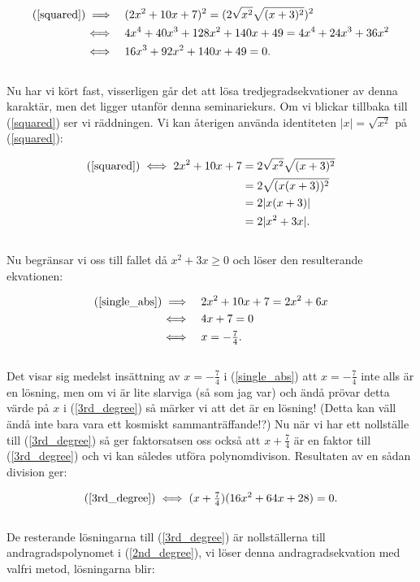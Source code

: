 \documentclass{article}
\begin{document}
\begin{align}
  \text{(\ref{squared})} \implies \quad & (2x^{2} + 10x + 7)^{2} = (2\sqrt{x^{2}}\sqrt{(x+3)^{2}})^{2} \nonumber\\
  \iff \quad & 4x^{4} + 40x^{3} + 128x^{2} + 140x + 49 = 4x^{4} + 24x^{3} + 36x^{2} \nonumber\\
  \iff \quad & 16x^{3} + 92x^{2} + 140x + 49 = 0\text{.} \label{3rd_degree}
\end{align}
\\
Nu har vi kört fast, visserligen går det att lösa tredjegradsekvationer av denna karaktär, men det ligger utanför denna seminariekurs. Om vi blickar tillbaka till (\ref{squared}) ser vi räddningen. Vi kan återigen använda identiteten $|x| = \sqrt{x^{2}}$ på (\ref{squared}):

\begin{align}
  \text(\ref{squared}) \iff 2x^{2} + 10x + 7 &= 2\sqrt{x^{2}}\sqrt{(x+3)^{2}}\nonumber\\
                        &= 2\sqrt{(x(x+3))^{2}}\nonumber\\
                        &= 2|x(x+3)|\nonumber\\
                        &= 2|x^{2} + 3x|\text{.} \label{single_abs}
\end{align}
\\
Nu begränsar vi oss till fallet då $x^{2} + 3x \geq 0$ och löser den resulterande ekvationen:

\begin{align*}
  \text{(\ref{single_abs})} \implies \quad & 2x^{2} + 10x + 7 = 2x^{2} + 6x\\
  \iff \quad & 4x + 7 = 0 \\
  \iff \quad & x = -\tfrac{7}{4}\text{.}
\end{align*}
\\
Det visar sig medelst insättning av $x=-\tfrac{7}{4}$ i (\ref{single_abs}) att $x = -\tfrac{7}{4}$ inte alls är en lösning, men om vi är lite slarviga (så som jag var) och ändå prövar detta värde på $x$ i (\ref{3rd_degree}) så märker vi att det är en lösning! (Detta kan väll ändå inte bara vara ett kosmiskt sammanträffande!?) Nu när vi har ett nollställe till (\ref{3rd_degree}) så ger faktorsatsen oss också att $x + \tfrac{7}{4}$ är en faktor till (\ref{3rd_degree}) och vi kan således utföra polynomdivison. Resultaten av en sådan division ger:

\begin{gather}
  \text{(\ref{3rd_degree})} \iff (x + \tfrac{7}{4})(16x^{2} + 64x + 28) = 0\text{.} \label{2nd_degree}
\end{gather}
\\
De resterande lösningarna till (\ref{3rd_degree}) är nollställerna till andragradspolynomet i (\ref{2nd_degree}), vi löser denna andragradsekvation med valfri metod, lösningarna blir:
\end{document}
